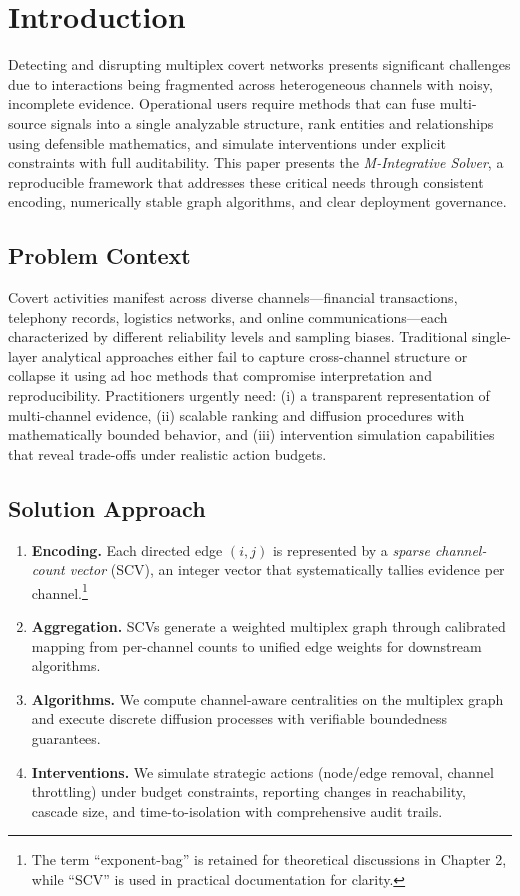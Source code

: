 \documentclass[12pt]{article}
\theoremstyle{plain}
\begin{document}
\linenumbers
\section{Introduction}
\noindent Detecting and disrupting multiplex covert networks presents significant challenges due to interactions being fragmented across heterogeneous channels with noisy, incomplete evidence. Operational users require methods that can fuse multi-source signals into a single analyzable structure, rank entities and relationships using defensible mathematics, and simulate interventions under explicit constraints with full auditability. This paper presents the \emph{M-Integrative Solver}, a reproducible framework that addresses these critical needs through consistent encoding, numerically stable graph algorithms, and clear deployment governance.

\subsection*{Problem Context}
Covert activities manifest across diverse channels—financial transactions, telephony records, logistics networks, and online communications—each characterized by different reliability levels and sampling biases. Traditional single-layer analytical approaches either fail to capture cross-channel structure or collapse it using ad hoc methods that compromise interpretation and reproducibility. Practitioners urgently need: (i) a transparent representation of multi-channel evidence, (ii) scalable ranking and diffusion procedures with mathematically bounded behavior, and (iii) intervention simulation capabilities that reveal trade-offs under realistic action budgets.

\subsection*{Solution Approach}
\begin{enumerate}
  \item \textbf{Encoding.} Each directed edge $(i,j)$ is represented by a \emph{sparse channel-count vector} (SCV), an integer vector that systematically tallies evidence per channel.\footnote{The term ``exponent-bag'' is retained for theoretical discussions in Chapter 2, while ``SCV'' is used in practical documentation for clarity.}
  \item \textbf{Aggregation.} SCVs generate a weighted multiplex graph through calibrated mapping from per-channel counts to unified edge weights for downstream algorithms.
  \item \textbf{Algorithms.} We compute channel-aware centralities on the multiplex graph and execute discrete diffusion processes with verifiable boundedness guarantees.
  \item \textbf{Interventions.} We simulate strategic actions (node/edge removal, channel throttling) under budget constraints, reporting changes in reachability, cascade size, and time-to-isolation with comprehensive audit trails.
\end{enumerate}
\end{document}
